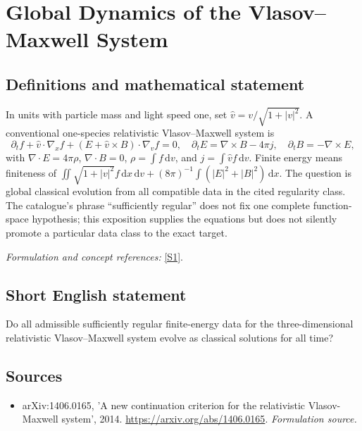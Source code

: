 \documentclass[11pt]{article}
\begin{document}
\section*{\texorpdfstring{Global Dynamics of the Vlasov–Maxwell System}{Global Dynamics of the Vlasov–Maxwell System}}\label{statement}
\subsection{Definitions and mathematical statement}
In units with particle mass and light speed one, set $\widehat v=v/\sqrt{1+|v|^2}$. A conventional one-species relativistic Vlasov--Maxwell system is
\[
 \partial_tf+\widehat v\cdot\nabla_xf+(E+\widehat v\times B)\cdot\nabla_vf=0,
 \quad \partial_tE=\nabla\times B-4\pi j,\quad\partial_tB=-\nabla\times E,
\]
with $\nabla\cdot E=4\pi\rho$, $\nabla\cdot B=0$, $\rho=\int f{\,\mathrm{d}} v$, and $j=\int\widehat v f{\,\mathrm{d}} v$. Finite energy means finiteness of
$\iint\sqrt{1+|v|^2}f{\,\mathrm{d}} x{\,\mathrm{d}} v+(8\pi)^{-1}\int(|E|^2+|B|^2){\,\mathrm{d}} x$.
The question is global classical evolution from all compatible data in the cited regularity class. The catalogue's phrase ``sufficiently regular'' does not fix one complete function-space hypothesis; this exposition supplies the equations but does not silently promote a particular data class to the exact target.
\par\smallskip\textit{Formulation and concept references:} \href{https://arxiv.org/abs/1406.0165}{[S1]}.

\subsection{Short English statement}
Do all admissible sufficiently regular finite-energy data for the three-dimensional relativistic Vlasov–Maxwell system evolve as classical solutions for all time?
\subsection{Sources}
\begin{itemize}
\item[S1]arXiv:1406.0165, 'A new continuation criterion for the relativistic Vlasov-Maxwell system', 2014.
\url{https://arxiv.org/abs/1406.0165}.
\textit{Formulation source.}
\end{itemize}
\end{document}
